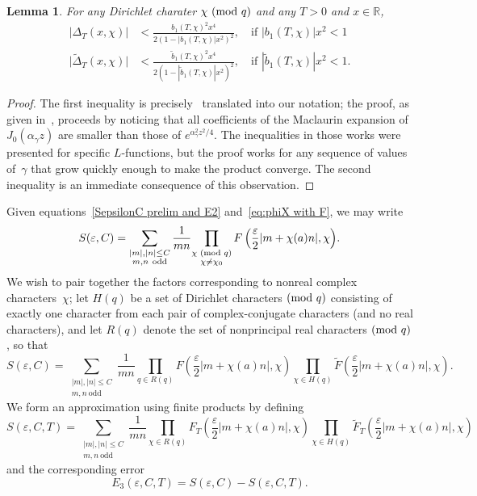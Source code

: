 \documentclass[11pt]{article}
\theoremstyle{plain}
\newtheorem{lemma}[thm]{Lemma}
\theoremstyle{definition}
\numberwithin{equation}{section}
\renewcommand{\mod}[1]{{\ifmmode\text{\rm\ (mod~$#1$)}\else\discretionary{}{}{\hbox{\!\!}}\rm(mod~$#1$)\fi}}
\newcommand{\R}{\mathbb R}
\newcommand{\0}{{\vec 0}}
\begin{document}
\begin{lemma} \label{Delta_T lemma}
For any Dirichlet charater $\chi\mod q$ and any $T>0$ and $x\in\R$,
\begin{align*}
|\Delta_T(x,\chi)| &< \frac{b_1(T,\chi)^2x^4}{2(1-|b_1(T,\chi)|x^2)^2},\quad\text{if } |b_1(T,\chi)|x^2<1 \\
\bigl| \widetilde{\Delta}_T(x,\chi) \bigr| &< \frac{\widetilde{b}_1(T,\chi)^2x^4}{2(1-|\widetilde{b}_1(T,\chi)|x^2)^2},\quad \text{if } |\widetilde{b}_1(T,\chi)|x^2<1.
\end{align*}
\end{lemma}

\begin{proof}
The first inequality is precisely~\cite[equation~(3-27)]{BSRPNR} translated into our notation; the proof, as given in~\cite[Section~4.3]{RS94}, proceeds by noticing that all coefficients of the Maclaurin expansion of $J_0(\alpha_\gamma z)$ are smaller than those of $e^{\alpha_\gamma^2z^2/4}$. The inequalities in those works were presented for specific $L$-functions, but the proof works for any sequence of values of~$\gamma$ that grow quickly enough to make the product converge. The second inequality is an immediate consequence of this observation.
\end{proof}

Given equations~\eqref{SepsilonC prelim and E2} and~\eqref{eq:phiX with F}, we may write
\[
S(\varepsilon, C)=\sum_{\substack{|m|,|n|\le C\\ m,n\ \text{odd}}}\frac1{mn}{\prod_{\substack{\chi \mod{q}\\ \chi\neq \chi_0}} F\left(\frac{\varepsilon}{2}|m+\chi(a)n|,\chi\right)}.
\]
We wish to pair together the factors corresponding to nonreal complex characters~$\chi$; let $H(q)$ be a set of Dirichlet characters$\mod q$ consisting of exactly one character from each pair of complex-conjugate characters (and no real characters), and let $R(q)$ denote the set of nonprincipal real characters$\mod q$, so that
\[
S(\varepsilon, C)=\sum_{\substack{|m|,|n|\le C\\ m,n\ \text{odd}}}\frac1{mn} \prod_{q\in R(q)} F\left(\frac{\varepsilon}{2}|m+\chi(a)n|,\chi\right) \prod_{\chi\in H(q)} \widetilde{F}\left(\frac{\varepsilon}{2}|m+\chi(a)n|,\chi\right).
\]
We form an approximation using finite products by defining
\begin{equation} \label{S(varepsilon,C,T)}
S(\varepsilon,C,T)=\sum_{\substack{|m|,|n|\le C\\ m,n\ \text{odd}}}\frac1{mn}{\prod_{\chi\in R(q)} F_T\left(\frac{\varepsilon}{2}|m+\chi(a)n|,\chi\right)\prod_{\chi\in H(q)} \widetilde{F}_T\left(\frac{\varepsilon}{2}|m+\chi(a)n|,\chi\right)}
\end{equation}
and the corresponding error
\begin{equation} \label{E3 def}
E_3(\varepsilon,C,T) = S(\varepsilon, C) - S(\varepsilon,C,T).
\end{equation}
\end{document}
